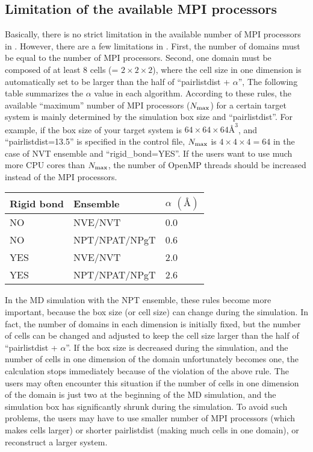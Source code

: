 \documentclass[a4paper,11pt,oneside,english]{sphinxmanual}
\begin{document}
\subsection{Limitation of the available MPI processors}
\label{\detokenize{02_Available_Programs:limitation-of-the-available-mpi-processors}}
Basically, there is no strict limitation in the available number of MPI processors in .
However, there are a few limitations in .
First, the number of domains must be equal to the number of MPI processors.
Second, one domain must be composed of at least 8 cells (= \(2{\times}2{\times}2\)),
where the cell size in one dimension is automatically set to be larger than
the half of “pairlistdist + \(\alpha\)”,
The following table summarizes the \(\alpha\) value in each algorithm.
According to these rules, the available “maximum” number of MPI processors (\(N_{\rm max}\))
for a certain target system is mainly determined by the simulation box size and “pairlistdist”.
For example, if the box size of your target system is \(64{\times}64{\times}64 \text{\AA}^3\),
and “pairlistdist=13.5” is specified in the control file,
\(N_{\rm max}\) is \(4{\times}4{\times}4 = 64\) in the case of NVT ensemble and “rigid\_bond=YES”.
If the users want to use much more CPU cores than \(N_{\rm max}\),
the number of OpenMP threads should be increased instead of the MPI processors.


\begin{savenotes}\sphinxattablestart
\centering
\begin{tabulary}{\linewidth}[t]{|T|T|T|}
\hline
\sphinxstyletheadfamily 
Rigid bond
&\sphinxstyletheadfamily 
Ensemble
&\sphinxstyletheadfamily 
\(\alpha\) \((\text{\AA})\)
\\
\hline
NO
&
NVE/NVT
&
0.0
\\
\hline
NO
&
NPT/NPAT/NPgT
&
0.6
\\
\hline
YES
&
NVE/NVT
&
2.0
\\
\hline
YES
&
NPT/NPAT/NPgT
&
2.6
\\
\hline
\end{tabulary}
\par
\sphinxattableend\end{savenotes}

In the MD simulation with the NPT ensemble, these rules become more important,
because the box size (or cell size) can change during the simulation.
In fact, the number of domains in each dimension is initially fixed, but the number of cells can be
changed and adjusted to keep the cell size larger than the half of “pairlistdist + \(\alpha\)”.
If the box size is decreased during the simulation, and the number of cells in one dimension of the
domain unfortunately becomes one, the calculation stops immediately because of the violation of the above rule.
The users may often encounter this situation if the number of cells in one dimension of the domain
is just two at the beginning of the MD simulation, and the simulation box has significantly shrunk during the simulation.
To avoid such problems, the users may have to use smaller number of MPI processors
(which makes cells larger) or shorter pairlistdist (making much cells in one domain),
or reconstruct a larger system.
\end{document}
